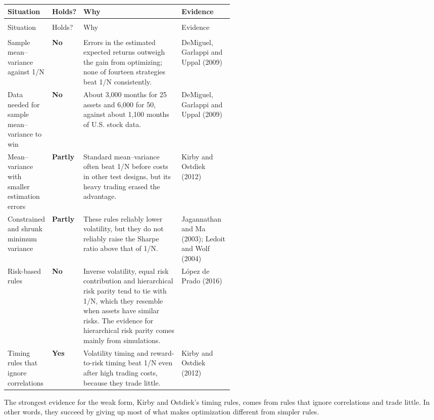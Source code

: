 {\small
\begin{longtable}{@{}>{\raggedright\arraybackslash}p{0.19\linewidth}>{\raggedright\arraybackslash}p{0.10\linewidth}>{\raggedright\arraybackslash}p{}>{\raggedright\arraybackslash}p{0.23\linewidth}@{}}
\toprule
Situation & Holds? & Why & Evidence \\
\midrule
\endfirsthead
\multicolumn{4}{@{}l}{\emph{(continued)}} \\
\toprule
Situation & Holds? & Why & Evidence \\
\midrule
\endhead
\midrule
\multicolumn{4}{r@{}}{\emph{(continued on the next page)}} \\
\endfoot
\bottomrule
\endlastfoot
Sample mean--variance against 1/N & \textbf{No} & Errors in the estimated expected returns outweigh the gain from optimizing; none of fourteen strategies beat 1/N consistently. & DeMiguel, Garlappi and Uppal (2009) \\
\addlinespace[3pt]
Data needed for sample mean--variance to win & \textbf{No} & About 3,000 months for 25 assets and 6,000 for 50, against about 1,100 months of U.S. stock data. & DeMiguel, Garlappi and Uppal (2009) \\
\addlinespace[3pt]
Mean--variance with smaller estimation errors & \textbf{Partly} & Standard mean--variance often beat 1/N before costs in other test designs, but its heavy trading erased the advantage. & Kirby and Ostdiek (2012) \\
\addlinespace[3pt]
Constrained and shrunk minimum variance & \textbf{Partly} & These rules reliably lower volatility, but they do not reliably raise the Sharpe ratio above that of 1/N. & Jagannathan and Ma (2003); Ledoit and Wolf (2004) \\
\addlinespace[3pt]
Risk-based rules & \textbf{No} & Inverse volatility, equal risk contribution and hierarchical risk parity tend to tie with 1/N, which they resemble when assets have similar risks. The evidence for hierarchical risk parity comes mainly from simulations. & L\'opez de Prado (2016) \\
\addlinespace[3pt]
Timing rules that ignore correlations & \textbf{Yes} & Volatility timing and reward-to-risk timing beat 1/N even after high trading costs, because they trade little. & Kirby and Ostdiek (2012) \\
\end{longtable}
}

The strongest evidence for the weak form, Kirby and Ostdiek's timing rules, comes from rules that ignore correlations and trade little. In other words, they succeed by giving up most of what makes optimization different from simpler rules.

